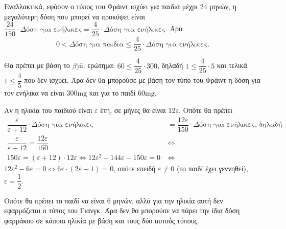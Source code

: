 \begin{alist}
\begin{rlist}
Εναλλακτικά, εφόσον ο τύπος του Φράιντ ισχύει για παιδιά μέχρι $24$ μηνών, η μεγαλύτερη
δόση που μπορεί να προκύψει είναι $\dfrac{24}{150} \cdot \Delta\text{όση για ενήλικες} = \dfrac{4}{25} \cdot \Delta\text{όση για ενήλικες}$. Άρα
\[0 < \Delta\text{όση για παιδια} \le \dfrac{4}{25} \cdot \Delta\text{όση για ενήλικες}.\]

\item Θα πρέπει με βάση το $\beta)$ii. ερώτημα:
$60 \le \dfrac{4}{25} \cdot 300$, δηλαδή
$1 \le \dfrac{4}{25} \cdot 5$ και τελικά $1 \le \dfrac{4}{5}$ που δεν ισχύει. Άρα δεν θα μπορούσε με βάση τον τύπο του
Φράιντ η δόση για τον ενήλικα να είναι $300\text{mg}$ και για το παιδί $60\text{mg}$.
\end{rlist}

\item Αν η ηλικία του παιδιού είναι $\varepsilon$ έτη, σε μήνες θα είναι $12\varepsilon$. Οπότε θα πρέπει
\begin{align*}
\dfrac{\varepsilon}{\varepsilon + 12} \cdot \Delta\text{όση για ενήλικες} &= \dfrac{12\varepsilon}{150} \cdot \Delta\text{όση για ενήλικες}\text{, δηλαδή} \\
\dfrac{\varepsilon}{\varepsilon + 12} = \dfrac{12\varepsilon}{150} \ &\Leftrightarrow \\
150\varepsilon = (\varepsilon + 12) \cdot 12\varepsilon \Leftrightarrow 12\varepsilon^2 + 144\varepsilon - 150\varepsilon = 0 \ &\Leftrightarrow
\end{align*}
$12\varepsilon^2 - 6\varepsilon = 0 \Leftrightarrow 6\varepsilon \cdot (2\varepsilon - 1) = 0$, οπότε επειδή $\varepsilon \neq 0$ (το παιδί έχει γεννηθεί), $\varepsilon = \dfrac{1}{2}$.

Οπότε θα πρέπει το παιδί να είναι $6$ μηνών, αλλά για την ηλικία αυτή δεν εφαρμόζεται ο τύπος
του Γιανγκ. Άρα δεν θα μπορούσε να πάρει την ίδια δόση φαρμάκου σε κάποια ηλικία με
βάση και τους δύο αυτούς τύπους.
\end{alist}

